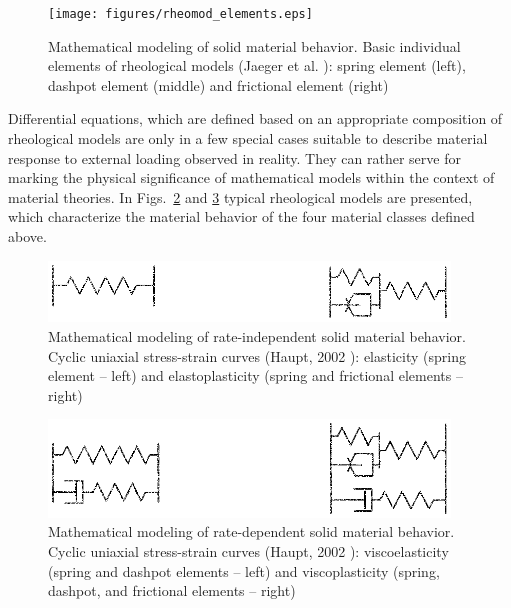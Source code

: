 \newpage

\begin{figure}[htb!]
\begin{center}
\footnotesize
\texttt{[image: figures/rheomod\_elements.eps]}
\caption{Mathematical modeling of solid material behavior. Basic individual elements of rheological models (Jaeger et al. \cite{JCZ:2007}): spring element (left), dashpot element (middle) and frictional element (right)}
\label{fig:rheomod_elem}
\end{center}
\end{figure}

Differential equations, which are defined based on an appropriate composition of rheological models are only in a few special cases suitable to describe material response to external loading observed in reality. They can rather serve for marking the physical significance of mathematical models within the context of material theories. In Figs.~\ref{fig:rheomod_el_elpl} and \ref{fig:rheomod_vel_vpl} typical rheological models are presented, which characterize the material behavior of the four material classes defined above.

\begin{figure}[htb!]
\begin{center}
\footnotesize
\includegraphics[width=0.95\textwidth]{figures/rheomod_el_elpl.eps}
\caption{Mathematical modeling of rate-independent solid material behavior. Cyclic uniaxial stress-strain curves (Haupt, 2002 \cite{Haupt:2002}): elasticity (spring element -- left) and elastoplasticity (spring and frictional elements -- right)}
\label{fig:rheomod_el_elpl}
\end{center}
\end{figure}

\begin{figure}[htb!]
\begin{center}
\footnotesize
\includegraphics[width=0.95\textwidth]{figures/rheomod_vel_vpl.eps}
\caption{Mathematical modeling of rate-dependent solid material behavior. Cyclic uniaxial stress-strain curves (Haupt, 2002 \cite{Haupt:2002}): viscoelasticity (spring and dashpot elements -- left) and viscoplasticity (spring, dashpot, and frictional elements -- right)}
\label{fig:rheomod_vel_vpl}
\end{center}
\end{figure}

